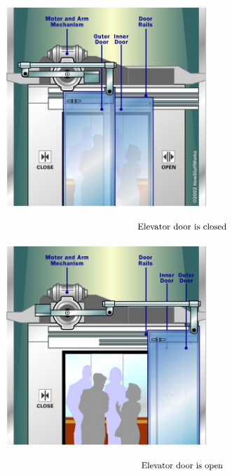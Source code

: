 




\topmatter

\begin{center}
\includegraphics[width=3in]{elevator-door-closed.JPG}
\end{center}
\[\text{{\small Elevator door is closed}}\]

\begin{center}
\includegraphics[width=3in]{elevator-door-open.JPG}
\end{center}
\[\text{{\small Elevator door is open}}\]


